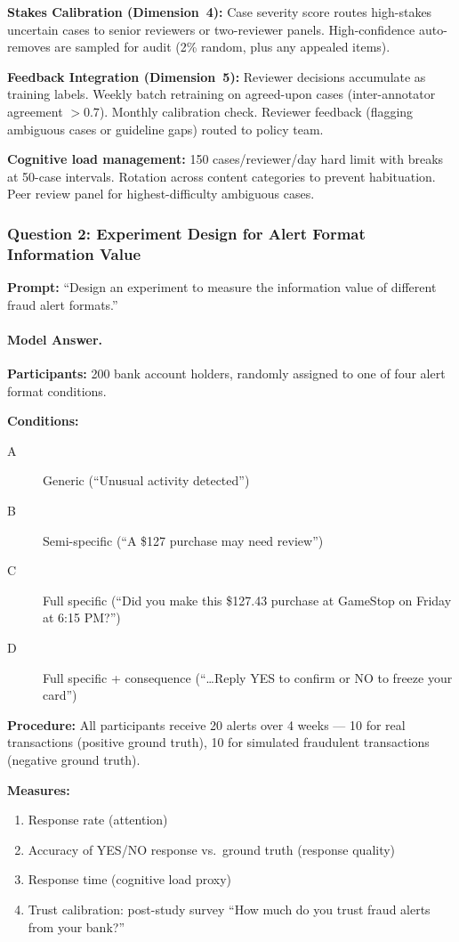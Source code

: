 \textbf{Stakes Calibration (Dimension~4):}
Case severity score routes high-stakes uncertain cases to senior reviewers or two-reviewer panels. High-confidence auto-removes are sampled for audit (2\% random, plus any appealed items).

\textbf{Feedback Integration (Dimension~5):}
Reviewer decisions accumulate as training labels. Weekly batch retraining on agreed-upon cases (inter-annotator agreement $>0.7$). Monthly calibration check. Reviewer feedback (flagging ambiguous cases or guideline gaps) routed to policy team.

\textbf{Cognitive load management:}
150 cases/reviewer/day hard limit with breaks at 50-case intervals. Rotation across content categories to prevent habituation. Peer review panel for highest-difficulty ambiguous cases.

\subsubsection{Question 2: Experiment Design for Alert Format Information Value}

\textbf{Prompt:} ``Design an experiment to measure the information value of different fraud alert formats.''

\paragraph{Model Answer.}

\textbf{Participants:} 200 bank account holders, randomly assigned to one of four alert format conditions.

\textbf{Conditions:}
\begin{description}
    \item[A] Generic (``Unusual activity detected'')
    \item[B] Semi-specific (``A \$127 purchase may need review'')
    \item[C] Full specific (``Did you make this \$127.43 purchase at GameStop on Friday at 6:15 PM?'')
    \item[D] Full specific + consequence (``\ldots Reply YES to confirm or NO to freeze your card'')
\end{description}

\textbf{Procedure:} All participants receive 20 alerts over 4 weeks --- 10 for real transactions (positive ground truth), 10 for simulated fraudulent transactions (negative ground truth).

\textbf{Measures:}
\begin{enumerate}
    \item Response rate (attention)
    \item Accuracy of YES/NO response vs.\ ground truth (response quality)
    \item Response time (cognitive load proxy)
    \item Trust calibration: post-study survey ``How much do you trust fraud alerts from your bank?''
\end{enumerate}

